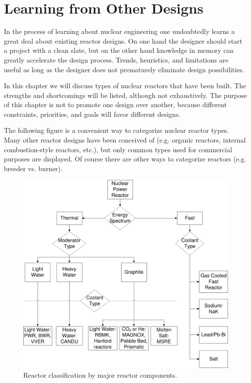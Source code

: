 \chapter{Learning from Other Designs}
In the process of learning about nuclear engineering one undoubtedly learns a great deal about existing reactor designs. On one hand the designer should start a project with a clean slate, but on the other hand knowledge in memory can greatly accelerate the design process.
Trends, heuristics, and limitations are useful as long as the designer does not prematurely eliminate design possibilities.

In this chapter we will discuss types of nuclear reactors that have been built. The strengths and shortcomings will be listed, although not exhaustively. 
The purpose of this chapter is not to promote one design over another, because different constraints, priorities, and goals will favor different designs.

The following figure is a convenient way to categorize nuclear reactor types. Many other reactor designs have been conceived of (e.g. organic reactors, internal combustion-style reactors, etc.), but only common types used for commercial purposes are displayed. 
Of course there are other ways to categorize reactors (e.g. breeder vs. burner).
\begin{figure}[!h]
\begin{center}
  \includegraphics[width=6in]{graphics/RxClassification.pdf}
  \caption[]{Reactor classification by major reactor components.}
\end{center}
\end{figure}

